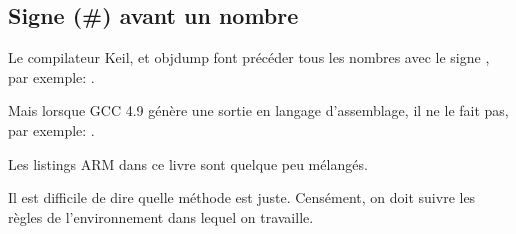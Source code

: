 ﻿

\subsection{Signe (\#) avant un nombre}

Le compilateur Keil, \IDA et objdump font précéder tous les nombres avec le signe
\q{\#}, par exemple:
.

Mais lorsque GCC 4.9 génère une sortie en langage d'assemblage, il ne le fait pas,
par exemple:
.

Les listings ARM dans ce livre sont quelque peu mélangés.

Il est difficile de dire quelle méthode est juste.
Censément, on doit suivre les règles de l'environnement dans lequel on travaille.




